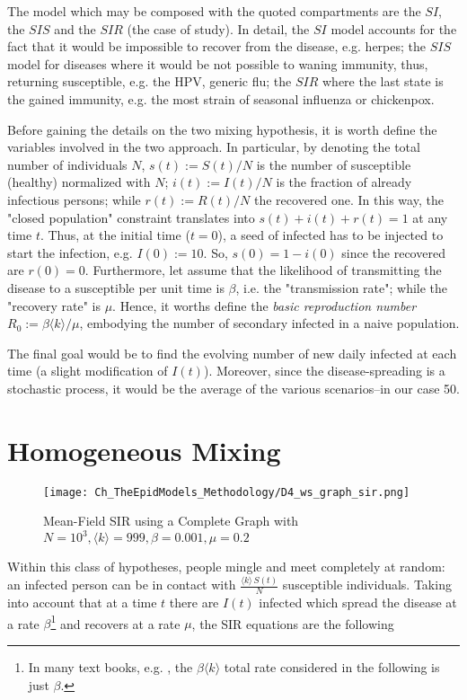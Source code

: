 \documentclass[a4paper,10pt,twoside]{book} %
\theoremstyle{definition}
\begin{document}
The model which may be composed with the quoted compartments are the $SI$, the $SIS$ and the $SIR$ (the case of study). In detail, the $SI$ model accounts for the fact that it would be impossible to recover from the disease, e.g. herpes; the $SIS$ model for diseases where it would be not possible to waning immunity, thus, returning susceptible, e.g. the HPV, generic flu; the $SIR$ where the last state is the gained immunity, e.g. the most strain of seasonal influenza or chickenpox.

Before gaining the details on the two mixing hypothesis, it is worth define the variables involved in the two approach.
In particular, by denoting the total number of individuals $N$, $s(t) := S(t)/N$ is the number of susceptible (healthy) normalized with $N$; $i(t):=I(t)/N$ is the fraction of already infectious persons; while $r(t) := R(t)/N$ the recovered one. In this way, the "closed population" constraint translates into $s(t)+i(t)+r(t)=1$ at any time $t$. 
Thus, at the initial time ($t = 0$), a seed of infected has to be injected to start the infection, e.g. $I(0) := 10$. So, $s(0) = 1 - i(0)$ since the recovered are $r(0) = 0$.
Furthermore, let assume that the likelihood of transmitting the disease to a susceptible per unit time is $\beta$, i.e. the "transmission rate"; while the "recovery rate" is $\mu$. Hence, it worths define the \textit{basic reproduction number}  $R_0 := \beta \langle k \rangle / \mu$, embodying the number of secondary infected in a naive population.

The final goal would be to find the evolving number of new daily infected at each time (a slight modification of $I(t)$). Moreover, since the disease-spreading is a stochastic process, it would be the average of the various scenarios--in our case 50.

\newpage
\section{Homogeneous Mixing}

\begin{figure}[ht]
	\texttt{[image: Ch\_TheEpidModels\_Methodology/D4\_ws\_graph\_sir.png]}
	\caption{Mean-Field SIR using a Complete Graph with $N = 10^{3}, \langle k \rangle = 999, \beta = 0.001,  \mu = 0.2$}
	\label{fig:MF_SIR}
\end{figure}

Within this class of hypotheses, people mingle and meet completely at random: an infected person can be in contact with {\large $\frac{\langle k \rangle \, S(t)}{N}$} susceptible individuals. Taking into account that at a time $t$ there are $I(t)$ infected which spread the disease at a rate $\beta$\footnote{In many text books, e.g. \cite{Newman:2010_Net:AnIntro}, the $\beta \langle k \rangle$ total rate considered in the following is just $\beta$.} and recovers at a rate $\mu$,
the SIR equations are the following \cite{Newman:2010_Net:AnIntro}
\end{document}
